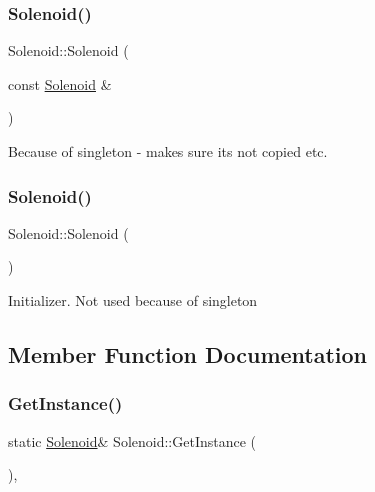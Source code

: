 \subsubsection{\texorpdfstring{Solenoid()}{Solenoid()}\hspace{0.1cm}{\footnotesize\ttfamily [1/2]}}
{\footnotesize\ttfamily Solenoid\+::\+Solenoid (\begin{DoxyParamCaption}\item[{const \hyperlink{class_solenoid}{Solenoid} \&}]{ }\end{DoxyParamCaption})\hspace{0.3cm}{\ttfamily [delete]}}

Because of singleton -\/ makes sure its not copied etc. \hypertarget{class_solenoid_a786f920a2fdb2136f19ea02cbdc53555}{}\label{class_solenoid_a786f920a2fdb2136f19ea02cbdc53555} 
\subsubsection{\texorpdfstring{Solenoid()}{Solenoid()}\hspace{0.1cm}{\footnotesize\ttfamily [2/2]}}
{\footnotesize\ttfamily Solenoid\+::\+Solenoid (\begin{DoxyParamCaption}{ }\end{DoxyParamCaption})\hspace{0.3cm}{\ttfamily [inline]}}

Initializer. Not used because of singleton 

\subsection{Member Function Documentation}
\hypertarget{class_solenoid_adc5bf799e0eb382eb6a5e4d471308f20}{}\label{class_solenoid_adc5bf799e0eb382eb6a5e4d471308f20} 
\subsubsection{\texorpdfstring{Get\+Instance()}{GetInstance()}}
{\footnotesize\ttfamily static \hyperlink{class_solenoid}{Solenoid}\& Solenoid\+::\+Get\+Instance (\begin{DoxyParamCaption}{ }\end{DoxyParamCaption})\hspace{0.3cm}{\ttfamily [inline]}, {\ttfamily [static]}}

